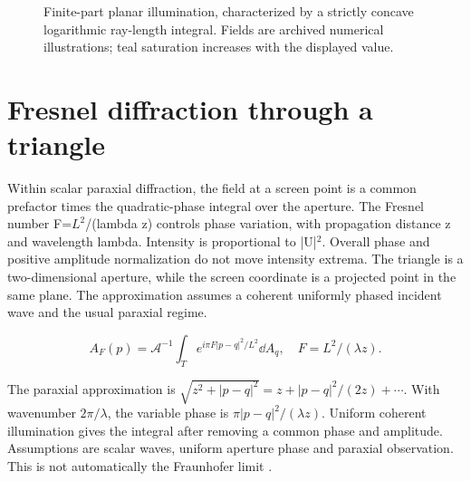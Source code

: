 \documentclass[11pt,oneside,openany]{book}
\begin{document}
\begin{figure}[htbp]
\caption[Finite-part planar illumination, characterized by a strictly concave logarithmic ray-length integral]{Finite-part planar illumination, characterized by a strictly concave logarithmic ray-length integral. Fields are archived numerical illustrations; teal saturation increases with the displayed value.}\label{fig:field-Illum}
\end{figure}

\section{Fresnel diffraction through a triangle}\label{sec:slide81}

Within scalar paraxial diffraction, the field at a screen point is a common prefactor times the quadratic-phase integral over the aperture. The Fresnel number F=$L^2$/(lambda z) controls phase variation, with propagation distance z and wavelength lambda. Intensity is proportional to |U|\ensuremath{^2}. Overall phase and positive amplitude normalization do not move intensity extrema. The triangle is a two-dimensional aperture, while the screen coordinate is a projected point in the same plane. The approximation assumes a coherent uniformly phased incident wave and the usual paraxial regime.


\[A_F(p)=\mathcal A^{-1}\int_Te^{i\pi F|p-q|^2/L^2}\dd A_q,\quad F=L^2/(\lambda z).\]



The paraxial approximation is
$\sqrt{z^2+|p-q|^2}=z+|p-q|^2/(2z)+\cdots$.
With wavenumber $2\pi/\lambda$, the variable phase is
$\pi|p-q|^2/(\lambda z)$. Uniform coherent illumination gives the
integral after removing a common phase and amplitude.
Assumptions are scalar waves, uniform aperture phase and paraxial
observation. This is not automatically the Fraunhofer limit
\cite{fresnel}.
\end{document}
